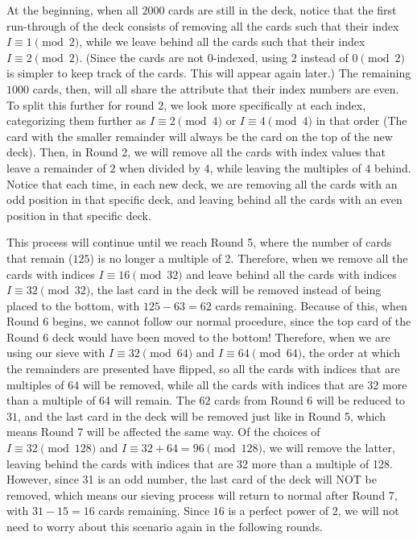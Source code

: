 \begin{enumerate}
 At the beginning, when all $2000$ cards are still in the deck, notice that the first run-through of the deck consists of removing all the cards such that their index $I\equiv 1\pmod{2}$, while we leave behind all the cards such that their index $I\equiv 2\pmod{2}$. (Since the cards are not $0$-indexed, using $2$ instead of $0\pmod{2}$ is simpler to keep track of the cards. This will appear again later.) The remaining $1000$ cards, then, will all share the attribute that their index numbers are even. To split this further for round 2, we look more specifically at each index, categorizing them further as $I\equiv 2\pmod 4$ or $I\equiv 4\pmod 4$ in that order (The card with the smaller remainder will always be the card on the top of the new deck). Then, in Round 2, we will remove all the cards with index values that leave a remainder of $2$ when divided by $4$, while leaving the multiples of $4$ behind. Notice that each time, in each new deck, we are removing all the cards with an odd position in that specific deck, and leaving behind all the cards with an even position in that specific deck.

 This process will continue until we reach  Round 5, where the number of cards that remain ($125$) is no longer a multiple of 2. Therefore, when we remove all the cards with indices $I\equiv 16\pmod{32}$ and leave behind all the cards with indices $I\equiv 32\pmod{32}$, the last card in the deck will be removed instead of being placed to the bottom, with $125-63=62$ cards remaining. Because of this, when Round 6 begins, we cannot follow our normal procedure, since the top card of the Round 6 deck would have been moved to the bottom! Therefore, when we are using our sieve with $I\equiv 32\pmod{64}$ and $I\equiv 64\pmod{64}$, the order at which the remainders are presented have flipped, so all the cards with indices that are multiples of 64 will be removed, while all the cards with indices that are 32 more than a multiple of 64 will remain. The $62$ cards from Round 6 will be reduced to $31$, and the last card in the deck will be removed just like in Round 5, which means Round 7 will be affected the same way. Of the choices of $I\equiv 32\pmod{128}$ and $I\equiv 32+64=96\pmod{128}$, we will remove the latter, leaving behind the cards with indices that are 32 more than a multiple of 128. However, since 31 is an odd number, the last card of the deck will NOT be removed, which means our sieving process will return to normal after Round 7, with $31-15=16$ cards remaining. Since $16$ is a perfect power of $2$, we will not need to worry about this scenario again in the following rounds.


\end{enumerate}
